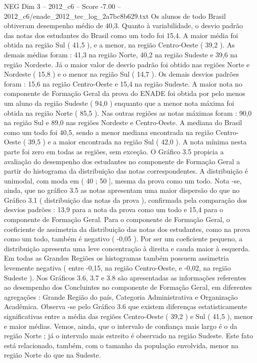 \begin{textsample}{NEG Dim 3 – 2012\_c6 – Score -7.00 – 2012\_c6/enade\_2012\_tec\_log\_2a7bc8b629.txt}
Os alunos de todo Brasil obtiveram desempenho médio de 40,3.
Quanto à variabilidade, o desvio padrão das notas dos estudantes do Brasil como um todo foi 15,4.
A maior média foi obtida na região Sul ( 41,5 ), e a menor, na região Centro-Oeste ( 39,2 ).
As demais médias foram : 41,3 na região Norte, 40,2 na região Sudeste e 39,6 na região Nordeste.
Já o maior valor de desvio padrão foi obtido nas regiões Norte e Nordeste ( 15,8 ) e o menor na região Sul ( 14,7 ).
Os demais desvios padrões foram : 15,6 na região Centro-Oeste e 15,4 na região Sudeste.
A maior nota no componente de Formação Geral da prova do ENADE foi obtida por pelo menos um aluno da região Sudeste ( 94,0 ) enquanto que a menor nota máxima foi obtida na região Norte ( 85,5 ).
Nas outras regiões as notas máximas foram : 90,0 na região Sul e 89,0 nas regiões Nordeste e Centro-Oeste.
A mediana do Brasil como um todo foi 40,5, sendo a menor mediana encontrada na região Centro-Oeste ( 39,5 ) e a maior encontrada na região Sul ( 42,0 ).
A nota mínima nesta parte foi zero em todas as regiões, sem exceção.
O Gráfico 3.5 propicia a avaliação do desempenho dos estudantes no componente de Formação Geral a partir do histograma da distribuição das notas correspondentes.
A distribuição é unimodal, com moda em ( 40 ; 50 ], mesma da prova como um todo.
Nota -se, ainda, que no gráfico 3.5 as notas apresentam uma maior dispersão do que no Gráfico 3.1 ( distribuição das notas da prova ), confirmada pela comparação dos desvios padrões : 13,9 para a nota da prova como um todo e 15,4 para o componente de Formação Geral.
Para o componente de Formação Geral, o coeficiente de assimetria da distribuição das notas dos estudantes, como na prova como um todo, também é negativo ( -0,05 ).
Por ser um coeficiente pequeno, a distribuição apresenta uma leve concentração à direita e cauda maior à esquerda.
Em todas as Grandes Regiões os histogramas também possuem assimetria levemente negativa ( entre -0,15, na região Centro-Oeste, e -0,02, na região Sudeste ).
Nos Gráficos 3.6, 3.7 e 3.8 são apresentadas as informações referentes ao desempenho dos Concluintes no componente de Formação Geral, em diferentes agregações : Grande Região do país, Categoria Administrativa e Organização Acadêmica.
Observa -se pelo Gráfico 3.6 que existem diferenças estatisticamente significativas entre a média das regiões Centro-Oeste ( 39,2 ) e Sul ( 41,5 ), menor e maior médias.
Vemos, ainda, que o intervalo de confiança mais largo é o da região Norte ; já o intervalo mais estreito é observado na região Sudeste.
Este fato está relacionado, também, com o tamanho da população envolvida, menor na região Norte do que na Sudeste.

\end{textsample}
